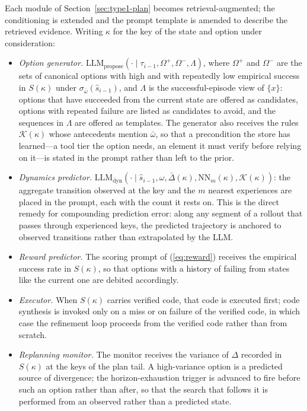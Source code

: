 \documentclass[11pt]{article}
\newcommand{\llm}[1]{\mathrm{LLM}_{\mathrm{#1}}}
\newcommand{\calK}{\mathcal{K}}
\newcommand{\shat}{\hat{s}}
\begin{document}
Each module of Section~\ref{sec:type1-plan} becomes retrieval-augmented; the conditioning is extended and the prompt template is amended to describe the retrieved evidence. Writing $\kappa$ for the key of the state and option under consideration:
\begin{itemize}[leftmargin=1.5em,itemsep=1pt]
\item \emph{Option generator.} $\llm{propose}(\cdot\mid\tau_{i-1},\Omega^{+},\Omega^{-},\Lambda)$, where $\Omega^{+}$ and $\Omega^{-}$ are the sets of canonical options with high and with repeatedly low empirical success in $S(\kappa)$ under $\sigma_{\bar\omega}(\shat_{i-1})$, and $\Lambda$ is the successful-episode view of $\{x\}$: options that have succeeded from the current state are offered as candidates, options with repeated failure are listed as candidates to avoid, and the sequences in $\Lambda$ are offered as templates. The generator also receives the rules $\calK(\kappa)$ whose antecedents mention $\bar\omega$, so that a precondition the store has learned---a tool tier the option needs, an element it must verify before relying on it---is stated in the prompt rather than left to the prior.
\item \emph{Dynamics predictor.} $\llm{dyn}(\cdot\mid\shat_{i-1},\omega,\bar\Delta(\kappa),\mathrm{NN}_m(\kappa),\calK(\kappa))$: the aggregate transition observed at the key and the $m$ nearest experiences are placed in the prompt, each with the count it rests on. This is the direct remedy for compounding prediction error: along any segment of a rollout that passes through experienced keys, the predicted trajectory is anchored to observed transitions rather than extrapolated by the LLM.
\item \emph{Reward predictor.} The scoring prompt of (\ref{eq:reward}) receives the empirical success rate in $S(\kappa)$, so that options with a history of failing from states like the current one are debited accordingly.
\item \emph{Executor.} When $S(\kappa)$ carries verified code, that code is executed first; code synthesis is invoked only on a miss or on failure of the verified code, in which case the refinement loop proceeds from the verified code rather than from scratch.
\item \emph{Replanning monitor.} The monitor receives the variance of $\Delta$ recorded in $S(\kappa)$ at the keys of the plan tail. A high-variance option is a predicted source of divergence; the horizon-exhaustion trigger is advanced to fire before such an option rather than after, so that the search that follows it is performed from an observed rather than a predicted state.
\end{itemize}
\end{document}
